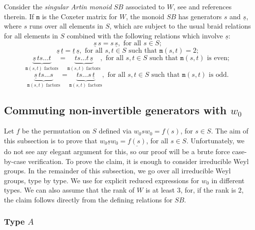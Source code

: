 \documentclass[a4paper]{amsart}
\begin{document}
Consider the {\em singular Artin monoid} $SB$ associated to 
$W$, see \cite{J-Z} and references therein. If
$\mathtt{m}$ is the Coxeter matrix for $W$, the monoid
$SB$ has generators $s$ and $\underline{s}$, where $s$ runs over
all elements in $S$,
which are subject to the usual braid relations for all 
elements in $S$ combined with the following relations 
which involve $\underline{s}$: 
\begin{displaymath}
\underline{s}\,s=s\, \underline{s},\text{ for all }s\in S;
\end{displaymath}
\begin{displaymath}
\underline{s}\,\underline{t}=\underline{t}\,\underline{s},
\text{ for all }s,t\in S\text{ such that }\mathtt{m}(s,t)=2;
\end{displaymath}
\begin{displaymath}
\underbrace{\underline{s}\,ts\dots t}_{\mathtt{m}(s,t)\text{ factors}}=
\underbrace{ts\dots t\, \underline{s}}_{\mathtt{m}(s,t)\text{ factors}},
\text{ for all }s,t\in S\text{ such that }\mathtt{m}(s,t)\text{ is even};
\end{displaymath}
\begin{displaymath}
\underbrace{\underline{s}\,ts\dots s}_{\mathtt{m}(s,t)\text{ factors}}=
\underbrace{ts\dots s\, \underline{t}}_{\mathtt{m}(s,t)\text{ factors}},
\text{ for all }s,t\in S\text{ such that }\mathtt{m}(s,t)\text{ is odd}.
\end{displaymath}

\subsection{Commuting non-invertible generators with $w_0$}\label{s5.2}

Let $f$ be the permutation on $S$ defined via $w_0sw_0=f(s)$,
for $s\in S$. The aim of this subsection is to prove that 
$w_0\underline{s}w_0=\underline{f(s)}$, for all $s\in S$.
Unfortunately, we do not see any elegant argument for this,
so our proof will be a brute force case-by-case verification.
To prove the claim, it is enough to consider irreducible 
Weyl groups.
In the remainder of this subsection, we go over all irreducible 
Weyl groups, type by type. We use \cite[Table~1]{BKOP} for
explicit reduced expressions for $w_0$ in different types.
We can also assume that the rank of $W$ is at least $3$,
for, if the rank is $2$, the claim follows directly from the
defining relations for $SB$.

\subsubsection{\bf Type $A$}\label{s5.2.1}
\end{document}
